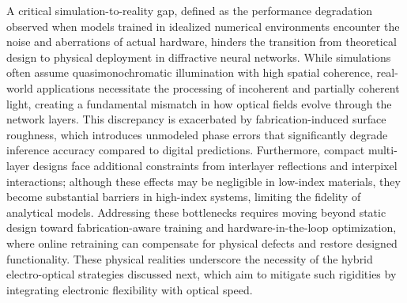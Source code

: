 A critical simulation-to-reality gap, defined as the performance degradation observed when models trained in idealized numerical environments encounter the noise and aberrations of actual hardware, hinders the transition from theoretical design to physical deployment in diffractive neural networks. While simulations often assume quasimonochromatic illumination with high spatial coherence, real-world applications necessitate the processing of incoherent and partially coherent light, creating a fundamental mismatch in how optical fields evolve through the network layers. \citep{doi_10_1364_oe_523619_ddeb1b53} This discrepancy is exacerbated by fabrication-induced surface roughness, which introduces unmodeled phase errors that significantly degrade inference accuracy compared to digital predictions. Furthermore, compact multi-layer designs face additional constraints from interlayer reflections and interpixel interactions; although these effects may be negligible in low-index materials, they become substantial barriers in high-index systems, limiting the fidelity of analytical models. Addressing these bottlenecks requires moving beyond static design toward fabrication-aware training and hardware-in-the-loop optimization, where online retraining can compensate for physical defects and restore designed functionality. These physical realities underscore the necessity of the hybrid electro-optical strategies discussed next, which aim to mitigate such rigidities by integrating electronic flexibility with optical speed. \citep{doi_10_1038_s41598_025_19638_8_1b2db1c9} \citep{doi_10_1364_oe_523619_ddeb1b53} \citep{doi_10_1109_dac56929_2023_10247715_f78d6713} \citep{doi_10_1364_ol_477605_b9242e3a}


